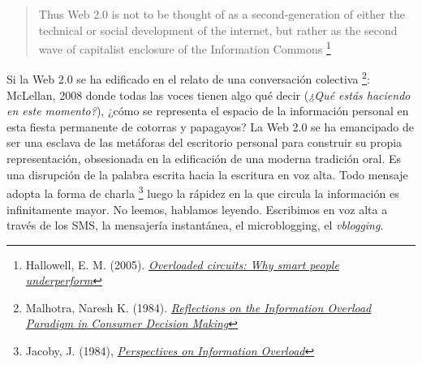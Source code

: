 \documentclass[12pt, a4paper,twoside]{book}
\begin{document}
\begin{quote}
Thus Web 2.0 is not to be thought of as a second-generation of
either the technical or social development of the internet, but
rather as the second wave of capitalist enclosure of the
Information Commons%
\footnote{Hallowell, E. M. (2005).
\emph{\href{http://tr.im/wSsS}{Overloaded circuits: Why smart people underperform}}}

\end{quote}
Si la Web 2.0 se ha edificado en el relato de una conversación
colectiva%
\footnote{Malhotra, Naresh K. (1984).
\emph{\href{http://www.jstor.org/pss/2488913}{Reflections on the Information Overload Paradigm in Consumer Decision Making}}}:
McLellan, 2008 donde todas las voces tienen algo qué decir
(\emph{¿Qué estás haciendo en este momento?}), ¿cómo se representa
el espacio de la información personal en esta fiesta permanente de
cotorras y papagayos? La Web 2.0 se ha emancipado de ser una
esclava de las metáforas del escritorio personal para construir su
propia representación, obsesionada en la edificación de una moderna
tradición oral. Es una disrupción de la palabra escrita hacia la
escritura en voz alta. Todo mensaje adopta la forma de charla%
\footnote{Jacoby, J. (1984),
\emph{\href{http://www.jstor.org/pss/2488912}{Perspectives on Information Overload}}}
luego la rápidez en la que circula la información es infinitamente
mayor. No leemos, hablamos leyendo. Escribimos en voz alta a través
de los SMS, la mensajería instantánea, el microblogging, el
\emph{vblogging}.
\end{document}
